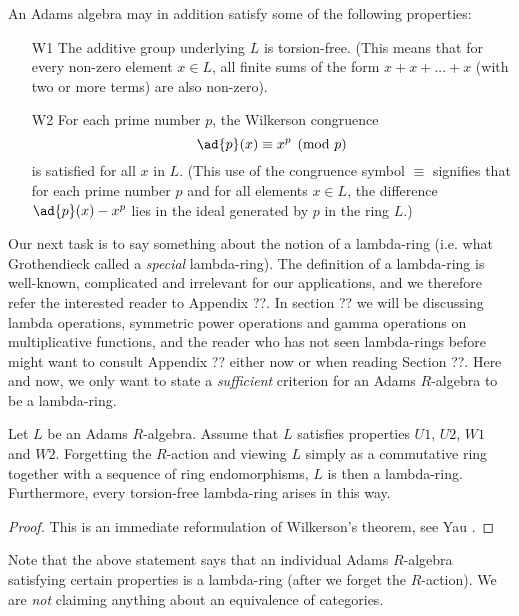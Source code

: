 \documentclass[a4paper]{article}
\begin{document}
An Adams algebra may in addition satisfy some of the following properties:

\begin{itemize}
\item[W1] The additive group underlying $L$ is torsion-free. (This means that for every non-zero element $x \in L$, all finite sums of the form $x+x+ \ldots +x$ (with two or more terms) are also non-zero).
\item[W2] For each prime number $p$, the Wilkerson congruence
$$  \ad{p}(x) \equiv x^p \pmod p  $$
is satisfied for all $x$ in $L$. (This use of the congruence symbol $\equiv$ signifies that for each prime number $p$ and for all elements $x \in L$, the difference $\ad{p}(x) -  x^p$ lies in the ideal generated by $p$ in the ring $L$.)
\end{itemize}

Our next task is to say something about the notion of a lambda-ring (i.e. what Grothendieck called a \emph{special} lambda-ring). The definition of a lambda-ring is well-known, complicated and irrelevant for our applications, and we therefore refer the interested reader to Appendix ??. In section ?? we will be discussing lambda operations, symmetric power operations and gamma operations on multiplicative functions, and the reader who has not seen lambda-rings before might want to consult Appendix ?? either now or when reading Section ??. Here and now, we only want to state a \emph{sufficient} criterion for an Adams $R$-algebra to be a lambda-ring.

\begin{theorem}
Let $L$ be an Adams $R$-algebra. Assume that $L$ satisfies properties $U1$, $U2$, $W1$ and $W2$. Forgetting the $R$-action and viewing $L$ simply as a commutative ring together with a sequence of ring endomorphisms, $L$ is then a lambda-ring. Furthermore, every torsion-free lambda-ring arises in this way. 
\end{theorem}
\begin{proof}
This is an immediate reformulation of Wilkerson's theorem, see Yau \cite[Theorem ??]{Yau}.
\end{proof}
\begin{remark}
Note that the above statement says that an individual Adams $R$-algebra satisfying certain properties is a lambda-ring (after we forget the $R$-action). We are \emph{not} claiming anything about an equivalence of categories.
\end{remark}
\end{document}
